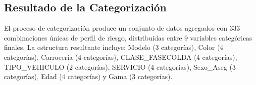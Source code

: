 \subsection{Resultado de la Categorización}

El proceso de categorización produce un conjunto de datos agregados con 333 combinaciones únicas de perfil de riesgo, distribuidas entre 9 variables categóricas finales. La estructura resultante incluye: Modelo (3 categorías), Color (4 categorías), Carroceria (4 categorías), CLASE\_FASECOLDA (4 categorías), TIPO\_VEHICULO (2 categorías), SERVICIO (4 categorías), Sexo\_Aseg (3 categorías), Edad (4 categorías) y Gama (3 categorías).